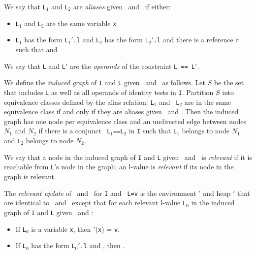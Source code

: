 \begin{Definition}
\label{def:alias}
We say that {\tt L$_1$} and {\tt L$_2$} are \emph{aliases} given \Euid\
and \Huid\ if either:
\begin{itemize}
\item {\tt L$_1$} and {\tt L$_2$} are the same variable {\tt x}
\item {\tt L$_1$} has the form {\tt L$_1'$.l} and {\tt L$_2$} has the
  form {\tt L$_2'$.l} and there is a reference {\tt r} such that \emph{} and \emph{}
\end{itemize}
\end{Definition}

\begin{Definition}
\label{def:ops}
We say that {\tt L} and {\tt L$'$} are the \emph{operands} of the
constraint {\tt L == L$'$}.
\end{Definition}

\begin{Definition}
\label{def:graph}
We define the \emph{induced graph} of {\tt I} and {\tt L} given \Euid\
and \Huid\ as follows.  Let $S$ be the set that includes {\tt L} as
well as all operands of identity tests in {\tt I}.  Partition $S$ into
equivalence classes defined by the alias relation:  {\tt L$_1$} and {\tt
  L$_2$} are in the same equivalence class if and only if they are
aliases given \Euid\ and \Huid.  %
Then the induced graph has one node per equivalence class and an
undirected edge between nodes $N_1$ and $N_2$ if there is a conjunct {\tt
  L$_1$==L$_2$} in {\tt I} such that {\tt L$_1$} belongs to node $N_1$
and {\tt L$_2$} belongs to node $N_2$.
\end{Definition}

\begin{Definition}
\label{def:relevant}
We say that a node in the induced graph of {\tt I} and {\tt L} given \Euid\
and \Huid\ is \emph{relevant} if it
is reachable from {\tt L}'s node in the graph; an l-value is
\emph{relevant} if 
its node in the graph is relevant.  %
\end{Definition}

\begin{Definition}
\label{def:update}
The \emph{relevant update} of \Euid\ and \Huid\ for {\tt I} and {\tt
  L=v} is the environment \Euid$'$ and heap \Huid$'$ that are identical to \Euid\ and
\Huid\ except that for each relevant l-value {\tt L$_0$} in the induced graph of {\tt I} and {\tt L} given \Euid\
and \Huid:
\begin{itemize}
\item If {\tt L$_0$} is a variable {\tt x}, then \Euid$'$({\tt x}) =
  {\tt v}.
\item If {\tt L$_0$} has the form {\tt L$_0'$.l} and
  ,
then \evalH{\Euid$'$}{\Huid$'$}{{\tt r.l}}{{\tt v}}.
\end{itemize}
\end{Definition}

